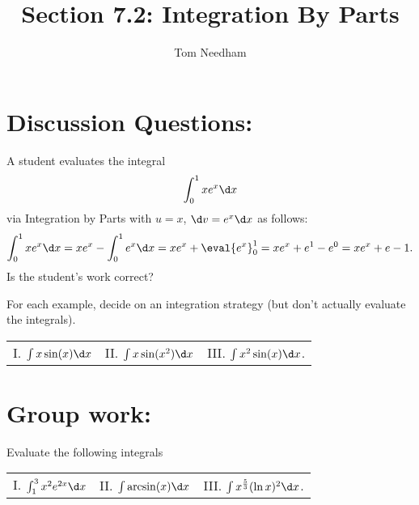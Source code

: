 \documentclass[handout]{ximera}
\title{Section 7.2: Integration By Parts}
\begin{document}
\begin{abstract}		\end{abstract}
\author{Tom Needham}

\maketitle




\section{Discussion Questions:}


\begin{problem}
A student evaluates the integral 
$$
\int_0^1 x e^x \d x
$$
via Integration by Parts with $u=x$, $\d v = e^x \d x$ as follows:
$$
\int_0^1 x e^x \d x = x e^x - \int_0^1 e^x \d x = x e^x + \eval{e^x}_0^1 = x e^x + e^1 - e^0 = xe^x + e -1.
$$
Is the student's work correct?
\end{problem}

\begin{freeResponse}

\end{freeResponse}

\begin{problem}
For each example, decide on an integration strategy (but don't actually evaluate the integrals).

\begin{center}
\begin{tabular}{lll}
I. $\int x \sin (x) \d x$ \hspace{0.2in} & II. $\int x \sin (x^2) \d x$  \hspace{0.2in} & III. $\int x^2 \sin (x) \d x$.
\end{tabular}
\end{center}
\end{problem}
\section{Group work:}


\begin{problem}
Evaluate the following integrals
\begin{center}
\begin{tabular}{lll}
I. $\int_1^3 x^2 e^{2x} \d x$ \hspace{0.2in} & II. $\int \arcsin(x) \d x$  \hspace{0.2in} & III. $\int x^{\frac{5}{3}} (\ln x)^2 \d x$.
\end{tabular}
\end{center}
	
\end{problem}
\end{document}
